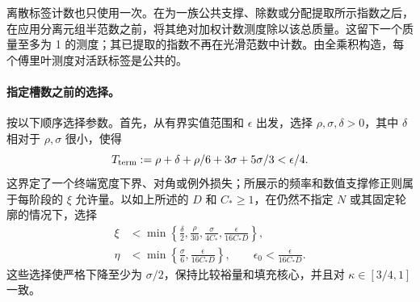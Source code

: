 \documentclass[11pt,a4paper]{article}
\numberwithin{equation}{section}
\numberwithin{figure}{section}
\theoremstyle{definition}
\theoremstyle{remark}
\begin{document}
离散标签计数也只使用一次。在为一族公共支撑、除数或分配提取所示指数之后，在应用分离元组半范数之前，将其绝对加权计数测度除以该总质量。这留下一个质量至多为 1 的测度；其已提取的指数不再在光滑范数中计数。由全乘积构造，每个傅里叶测度对活跃标签是公共的。\paragraph{指定槽数之前的选择。}
按以下顺序选择参数。首先，从有界实值范围和 \(\epsilon\) 出发，选择 \(\rho,\sigma,\delta>0\)，其中 \(\delta\) 相对于 \(\rho,\sigma\) 很小，使得
\[
 T_{\rm term}:=\rho+\delta+\rho/6+3\sigma+5\sigma/3<\epsilon/4.
\]
这界定了一个终端宽度下界、对角或例外损失；所展示的频率和数值支撑修正则属于每阶段的 \(\xi\) 允许量。以如上所述的 \(D\) 和 \(C_*\ge1\)，在仍然不指定 \(N\) 或其固定轮廓的情况下，选择
\begin{equation}
 \begin{aligned}
 \xi&<\min\left\{\frac\delta2,\frac\rho{30},
                  \frac{\sigma}{4C_*},
                  \frac{\epsilon}{16C_*D}\right\},\\
 \eta&<\min\left\{\frac\sigma6,
                   \frac{\epsilon}{16C_*D}\right\},\qquad
 \epsilon_0<\frac{\epsilon}{16C_*D}.
 \end{aligned}
 \label{old-eq:2.1i}
\end{equation}
这些选择使严格下降至少为 \(\sigma/2\)，保持比较裕量和填充核心，并且对 \(\kappa\in[3/4,1]\) 一致。
\end{document}

